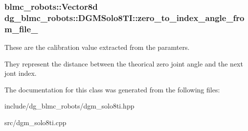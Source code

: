 \subsubsection[{\texorpdfstring{zero\+\_\+to\+\_\+index\+\_\+angle\+\_\+from\+\_\+file\+\_\+}{zero_to_index_angle_from_file_}}]{\setlength{\rightskip}{0pt plus 5cm}blmc\+\_\+robots\+::\+Vector8d dg\+\_\+blmc\+\_\+robots\+::\+D\+G\+M\+Solo8\+T\+I\+::zero\+\_\+to\+\_\+index\+\_\+angle\+\_\+from\+\_\+file\+\_\+\hspace{0.3cm}{\ttfamily [private]}}\hypertarget{classdg__blmc__robots_1_1DGMSolo8TI_a05609f544243050ecac91ec55c9d7066}{}\label{classdg__blmc__robots_1_1DGMSolo8TI_a05609f544243050ecac91ec55c9d7066}


These are the calibration value extracted from the paramters. 

They represent the distance between the theorical zero joint angle and the next jont index. 

The documentation for this class was generated from the following files\+:\begin{DoxyCompactItemize}
\item 
include/dg\+\_\+blmc\+\_\+robots/dgm\+\_\+solo8ti.\+hpp\item 
src/dgm\+\_\+solo8ti.\+cpp\end{DoxyCompactItemize}

